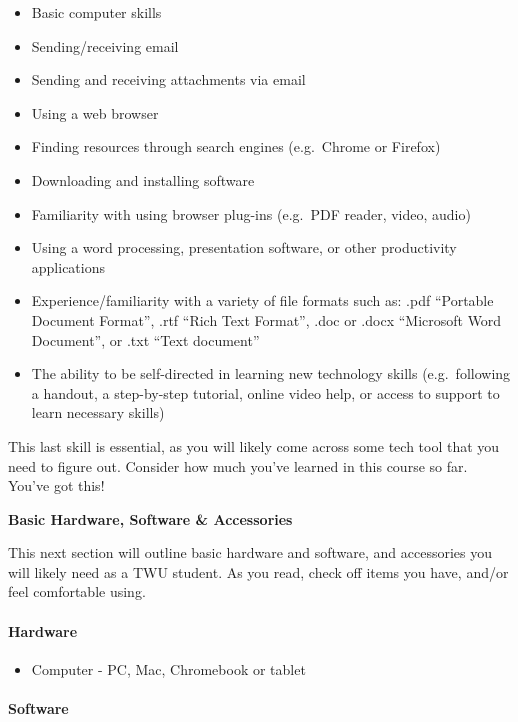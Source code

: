 \documentclass[
]{book}
\providecommand{\tightlist}{%
  \setlength{\itemsep}{0pt}\setlength{\parskip}{0pt}}
\theoremstyle{definition}
\theoremstyle{definition}
\theoremstyle{definition}
\theoremstyle{definition}
\theoremstyle{remark}
\begin{document}
\begin{itemize}
\tightlist
\item
  Basic computer skills\\
\item
  Sending/receiving email
\item
  Sending and receiving attachments via email
\item
  Using a web browser
\item
  Finding resources through search engines (e.g.~Chrome or Firefox)
\item
  Downloading and installing software
\item
  Familiarity with using browser plug-ins (e.g.~PDF reader, video, audio)
\item
  Using a word processing, presentation software, or other productivity applications
\item
  Experience/familiarity with a variety of file formats such as: .pdf ``Portable Document Format'', .rtf ``Rich Text Format'', .doc or .docx ``Microsoft Word Document'', or .txt ``Text document''
\item
  The ability to be self-directed in learning new technology skills (e.g.~following a handout, a step-by-step tutorial, online video help, or access to support to learn necessary skills)
\end{itemize}

This last skill is essential, as you will likely come across some tech tool that you need to figure out. Consider how much you've learned in this course so far. You've got this!

\textbf{Basic Hardware, Software \& Accessories}

This next section will outline basic hardware and software, and accessories you will likely need as a TWU student. As you read, check off items you have, and/or feel comfortable using.

\hypertarget{hardware}{%
\paragraph*{Hardware}\label{hardware}}

\begin{itemize}
\tightlist
\item
  Computer - PC, Mac, Chromebook or tablet
\end{itemize}

\hypertarget{software}{%
\paragraph*{Software}\label{software}}
\end{document}
